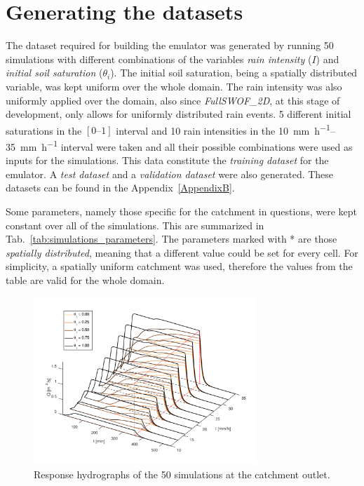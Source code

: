 \section{Generating the datasets}

The dataset required for building the emulator was generated by running \num{50} simulations with different combinations of the variables \emph{rain intensity} ($I$) and \emph{initial soil saturation} ($\theta_i$).
The initial soil saturation, being a spatially distributed variable, was kept uniform over the whole domain.
The rain intensity was also uniformly applied over the domain, also since \textit{FullSWOF\_2D}, at this stage of development, only allows for uniformly distributed rain events.
\num{5} different initial saturations in the $[\numrange{0}{1}]$ interval and \num{10} rain intensities in the \SIrange{10}{35}{\milli\metre\per\hour} interval were taken and all their possible combinations were used as inputs for the simulations.
This data constitute the \emph{training dataset} for the emulator.
A \emph{test dataset} and a \emph{validation dataset} were also generated.
These datasets can be found in the Appendix~\ref{AppendixB}.

Some parameters, namely those specific for the catchment in questions, were kept constant over all of the simulations.
This are summarized in Tab.~\ref{tab:simulations_parameters}.
The parameters marked with * are those \emph{spatially distributed}, meaning that a different value could be set for every cell.
For simplicity, a spatially uniform catchment was used, therefore the values from the table are valid for the whole domain.


\begin{figure}[htpb]
  \centering
  \includegraphics[width=0.75\textwidth]{Figures/hydrographs3d.png}
  \caption{Response hydrographs of the \num{50} simulations at the catchment outlet.}
  \label{fig:hydrographs3d}
\end{figure}


